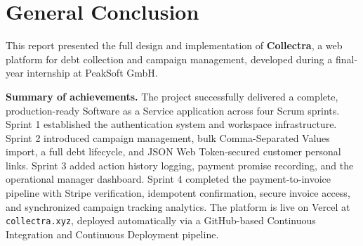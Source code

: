 \documentclass[12pt,a4paper]{report}
\begin{document}
\chapter*{General Conclusion}
{}

This report presented the full design and implementation of \textbf{Collectra}, a
web platform for debt collection and campaign management, developed during a
final-year internship at PeakSoft GmbH.

\textbf{Summary of achievements.}
The project successfully delivered a complete, production-ready Software as a Service application
across four Scrum sprints.
Sprint 1 established the authentication system and workspace infrastructure.
Sprint 2 introduced campaign management, bulk Comma-Separated Values import, a full debt lifecycle,
and JSON Web Token-secured customer personal links.
Sprint 3 added action history logging, payment promise recording, and the operational
manager dashboard.
Sprint 4 completed the payment-to-invoice pipeline with Stripe verification,
idempotent confirmation, secure invoice access, and synchronized campaign
tracking analytics.
The platform is live on Vercel at \texttt{collectra.xyz}, deployed automatically
via a GitHub-based Continuous Integration and Continuous Deployment pipeline.
\end{document}
